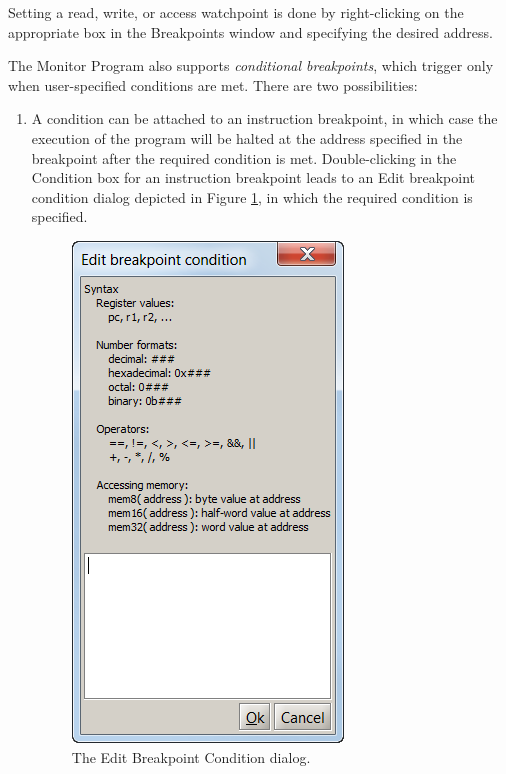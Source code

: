 \documentclass[11pt, twoside, pdftex]{article}
\begin{document}
Setting a read, write, or access watchpoint is done by
right-clicking on the appropriate box in the Breakpoints window
and specifying the desired address.

The Monitor Program also supports {\it conditional breakpoints},
which trigger only when user-specified conditions are met.
There are two possibilities:
\begin{enumerate}
\item A condition can be attached to an instruction breakpoint,
in which case the execution of the program will be halted at the
address specified in the breakpoint after the required condition
is met. Double-clicking in the {\sf Condition} box for
an instruction breakpoint leads to an
{\sf Edit breakpoint condition} dialog depicted in Figure \ref{fig:AMP_editbreakpointcondition},
in which the required condition is specified.

\begin{figure}[H]
   \begin{center}
      \includegraphics[scale=1]{screenshots/figure25.png}
   \end{center}
   \caption{The Edit Breakpoint Condition dialog.} 
   \label{fig:AMP_editbreakpointcondition}
\end{figure}
~\\


\end{enumerate}
\end{document}
